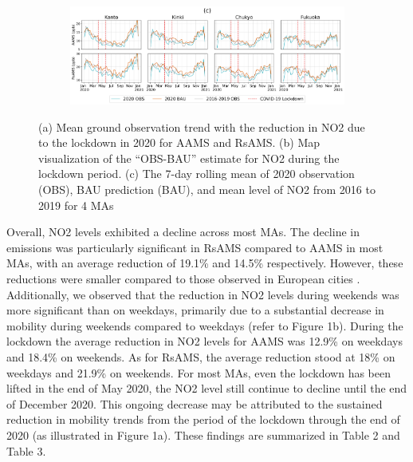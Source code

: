 \begin{figure}[tbh!]
\begin{subfigure}{.5\textwidth}
      \label{fig:chap4_fig4b}
    \end{subfigure}

    \begin{subfigure}{\textwidth}
        \centering
        \includegraphics[width=\textwidth]{figs/chap4/fig4c.png}
        \label{fig:chap4_fig4c}
      \end{subfigure}
    \caption[NO2 reduction trends in 2020]{(a) Mean ground observation trend with the reduction in NO2 due to the lockdown in 2020 for AAMS and RsAMS. (b) Map visualization of the “OBS-BAU” estimate for NO2 during the lockdown period. (c) The 7-day rolling mean of 2020 observation (OBS), BAU prediction (BAU), and mean level of NO2 from 2016 to 2019 for 4 MAs}
    \label{fig:chap4_fig4}
\end{figure}

Overall, NO2 levels exhibited a decline across most MAs. The decline in emissions was particularly significant in RsAMS compared to AAMS in most MAs, with an average reduction of 19.1\% and 14.5\% respectively. However, these reductions were smaller compared to those observed in European cities \citep{barre2021estimating,grange2021covid}. Additionally, we observed that the reduction in NO2 levels during weekends was more significant than on weekdays, primarily due to a substantial decrease in mobility during weekends compared to weekdays (refer to Figure 1b). During the lockdown the average reduction in NO2 levels for AAMS was 12.9\% on weekdays and 18.4\% on weekends. As for RsAMS, the average reduction stood at 18\% on weekdays and 21.9\% on weekends. For most MAs, even the lockdown has been lifted in the end of May 2020, the NO2 level still continue to decline until the end of December 2020. This ongoing decrease may be attributed to the sustained reduction in mobility trends from the period of the lockdown through the end of 2020 (as illustrated in Figure 1a). These findings are summarized in Table 2 and Table 3. \par

